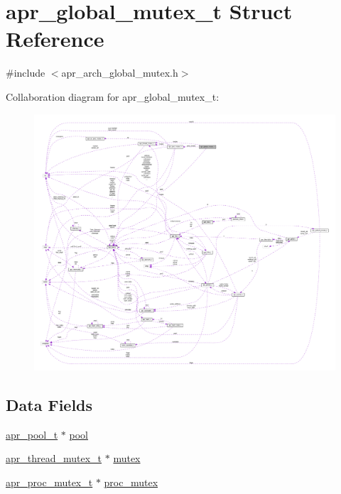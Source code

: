 \hypertarget{structapr__global__mutex__t}{}\section{apr\+\_\+global\+\_\+mutex\+\_\+t Struct Reference}
\label{structapr__global__mutex__t}


{\ttfamily \#include $<$apr\+\_\+arch\+\_\+global\+\_\+mutex.\+h$>$}



Collaboration diagram for apr\+\_\+global\+\_\+mutex\+\_\+t\+:
\nopagebreak
\begin{figure}[H]
\begin{center}
\leavevmode
\includegraphics[width=350pt]{structapr__global__mutex__t__coll__graph}
\end{center}
\end{figure}
\subsection*{Data Fields}
\begin{DoxyCompactItemize}
\item 
\hyperlink{structapr__pool__t}{apr\+\_\+pool\+\_\+t} $\ast$ \hyperlink{structapr__global__mutex__t_a9503c0abf18f7b498ecbf4233eefbcd8}{pool}
\item 
\hyperlink{structapr__thread__mutex__t}{apr\+\_\+thread\+\_\+mutex\+\_\+t} $\ast$ \hyperlink{structapr__global__mutex__t_a0464d8cc4d113c844588bf0fb98f7fa9}{mutex}
\item 
\hyperlink{structapr__proc__mutex__t}{apr\+\_\+proc\+\_\+mutex\+\_\+t} $\ast$ \hyperlink{structapr__global__mutex__t_a0b19e0f205f5cb03ec7e7f334c7dbce8}{proc\+\_\+mutex}
\end{DoxyCompactItemize}


